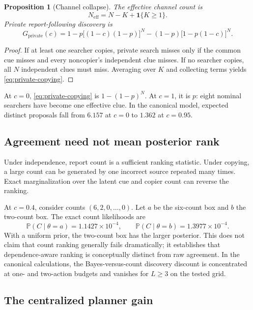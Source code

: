 \documentclass[11pt]{article}
\newtheorem{proposition}{Proposition}
\theoremstyle{definition}
\theoremstyle{remark}
\newcommand{\Prob}{\mathbb{P}}
\newcommand{\1}{\mathbf{1}}
\newcommand{\priv}{\mathrm{private}}
\begin{document}
\begin{proposition}[Channel collapse]
The effective channel count is
\begin{equation}
N_{\mathrm{eff}}=N-K+\1\{K\ge1\}.
\label{eq:effective-channels}
\end{equation}
Private report-following discovery is
\begin{equation}
G_{\priv}(c)
=1-p\bigl[(1-c)(1-p)\bigr]^N
-(1-p)\bigl[1-p(1-c)\bigr]^N.
\label{eq:private-copying}
\end{equation}
\end{proposition}

\begin{proof}
If at least one searcher copies, private search misses only if the common cue misses and every noncopier's independent clue misses. If no searcher copies, all $N$ independent clues must miss. Averaging over $K$ and collecting terms yields \cref{eq:private-copying}.
\end{proof}

At $c=0$, \cref{eq:private-copying} is $1-(1-p)^N$. At $c=1$, it is $p$: eight nominal searchers have become one effective clue. In the canonical model, expected distinct proposals fall from $6.157$ at $c=0$ to $1.362$ at $c=0.95$.

\subsection{Agreement need not mean posterior rank}

Under independence, report count is a sufficient ranking statistic. Under copying, a large count can be generated by one incorrect source repeated many times. Exact marginalization over the latent cue and copier count can reverse the ranking.

At $c=0.4$, consider counts $(6,2,0,\ldots,0)$. Let $a$ be the six-count box and $b$ the two-count box. The exact count likelihoods are
\[
\Prob(C\mid\theta=a)=1.1427\times10^{-4},
\qquad
\Prob(C\mid\theta=b)=1.3977\times10^{-4}.
\]
With a uniform prior, the two-count box has the larger posterior. This does not claim that count ranking generally fails dramatically; it establishes that dependence-aware ranking is conceptually distinct from raw agreement. In the canonical calculations, the Bayes-versus-count discovery discount is concentrated at one- and two-action budgets and vanishes for $L\ge3$ on the tested grid.

\subsection{The centralized planner gain}
\end{document}
